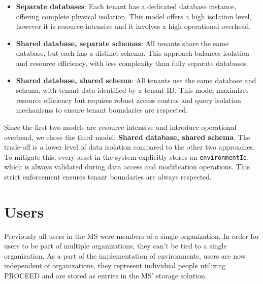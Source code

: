 \begin{itemize}
  \item \textbf{Separate databases}: Each tenant has a dedicated database instance,
    offering complete physical isolation.
    This model offers a high isolation level,
    however it is resource-intensive and it involves a high operational overhead.

  \item \textbf{Shared database, separate schemas}: All tenants share the same database, but each has a distinct schema. 
      This approach balances isolation and resource efficiency, with less complexity than fully separate databases.

  \item \textbf{Shared database, shared schema}: All tenants use the same database and schema, with tenant data identified by a tenant ID. This model maximizes resource efficiency but requires robust access control and query isolation mechanisms to ensure tenant boundaries are respected.
\end{itemize}

Since the first two models are resource-intensive and introduce operational
overhead, we chose the third model: \textbf{Shared database, shared schema}.
The trade-off is a lower level of data isolation compared to the other two approaches.
To mitigate this, every asset in the system explicitly stores an \lstinline{environmentId},
which is always validated during data access and modification operations.
This strict enforcement ensures tenant boundaries are always respected.


\section{Users}
\label{cha:conceptanddesign:users}

Previously all users in the MS were members of a single organization.
In order for users to be part of multiple organizations, they can't be tied to a single
organization.
As a part of the implementation of environments, users are now independent of
organizations,
they represent individual people utilizing PROCEED and are stored as entries in
the MS' storage solution.

